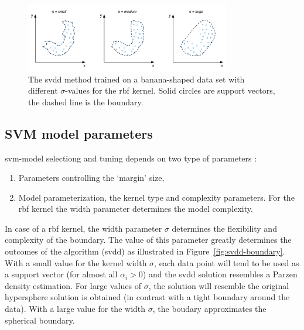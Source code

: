 \begin{figure}
  \centering
    \includegraphics[width=0.8\textwidth,keepaspectratio]{./Figures/chapter3/svdd-parameter-sigma.pdf}
  \caption[\gls{svdd} boundary]{The \gls{svdd} method trained on a banana-shaped data set with different $\sigma$-values for the \gls{rbf} kernel. Solid circles are support vectors, the dashed line is the boundary.}
  \label{fig:svdd-boundary-sigma}
\end{figure}




\subsection{SVM model parameters}\label{subsec:svm_model_parameters}
\gls{svm}-model selectiong and tuning depends on two type of parameters \cite{cherkassky2007learning}:
\begin{enumerate}
  \item Parameters controlling the `margin' size,
  \item Model parameterization, \eg the kernel type and complexity parameters.
  For the \gls{rbf} kernel the width parameter determines the model complexity.
\end{enumerate}

In case of a \gls{rbf} kernel, the width parameter $\sigma$ determines the flexibility and complexity of the boundary.
The value of this parameter greatly determines the outcomes of the algorithm (\eg \gls{svdd}) as illustrated in Figure~\ref{fig:svdd-boundary}.
With a small value for the kernel width $\sigma$, each data point will tend to be used as a support vector (for almost all $\alpha_i > 0$) and the \gls{svdd} solution resembles a Parzen density estimation.
For large values of $\sigma$, the solution will resemble the original hypersphere solution is obtained (in contrast with a tight boundary around the data).
With a large value for the width $\sigma$, the boudary approximates the spherical boundary.

